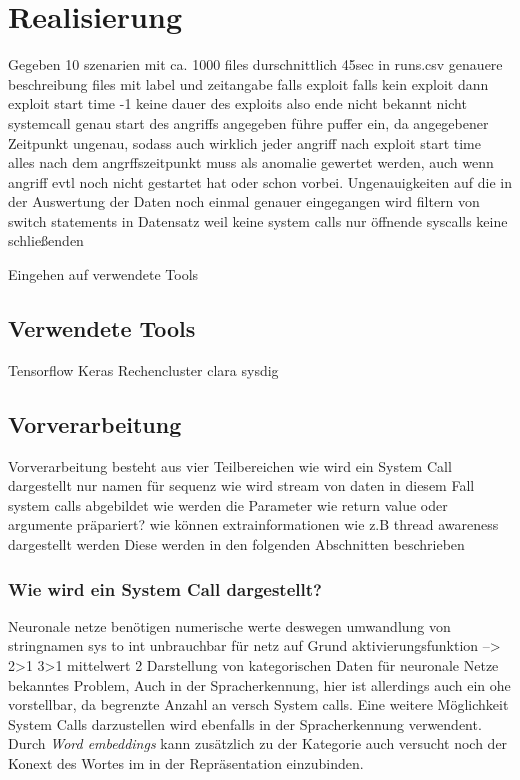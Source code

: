 
\chapter{Realisierung}\label{ch:realisierung}
    Gegeben 10 szenarien mit ca. 1000 files durschnittlich 45sec
    in runs.csv genauere beschreibung files mit label und zeitangabe falls exploit
    falls kein exploit dann exploit start time -1
    keine dauer des exploits also ende nicht bekannt 
    nicht systemcall genau start des angriffs angegeben 
    führe puffer ein, da angegebener Zeitpunkt ungenau, sodass auch wirklich jeder angriff nach exploit start time
    alles nach dem angrffszeitpunkt muss als anomalie gewertet werden, auch wenn angriff evtl noch nicht gestartet hat oder schon vorbei.
    Ungenauigkeiten auf die in der Auswertung der Daten noch einmal genauer eingegangen wird
    filtern von switch statements in Datensatz weil keine system calls
    nur öffnende syscalls keine schließenden

    Eingehen auf verwendete Tools 

\section{Verwendete Tools}
    Tensorflow Keras
    Rechencluster clara
    sysdig

\section{Vorverarbeitung}

    Vorverarbeitung besteht aus vier Teilbereichen 
    wie wird ein System Call dargestellt nur namen für sequenz
    wie wird stream von daten in diesem Fall system calls abgebildet
    wie werden die Parameter wie return value oder argumente präpariert?
    wie können extrainformationen wie z.B thread awareness dargestellt werden
    Diese werden in den folgenden Abschnitten beschrieben

    \subsection{Wie wird ein System Call dargestellt?}

        Neuronale netze benötigen numerische werte deswegen umwandlung von stringnamen 
        sys to int unbrauchbar für netz auf Grund aktivierungsfunktion --> 2>1 3>1 mittelwert 2
        Darstellung von kategorischen Daten für neuronale Netze bekanntes Problem,
        Auch in der Spracherkennung, hier ist allerdings auch ein ohe vorstellbar, da begrenzte Anzahl an versch
        System calls.
        Eine weitere Möglichkeit System Calls darzustellen wird ebenfalls in der Spracherkennung verwendent.
        Durch \textit{Word embeddings} kann zusätzlich zu der Kategorie auch versucht noch der Konext des Wortes im in der Repräsentation einzubinden.

